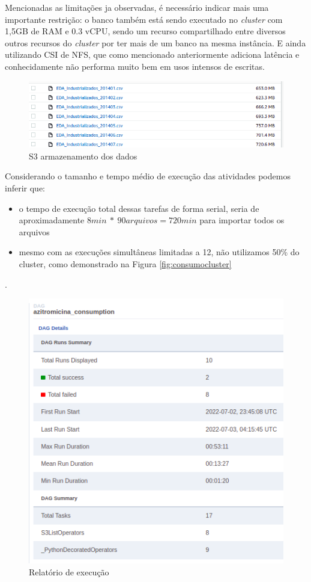Mencionadas as limitações ja observadas, é necessário indicar mais uma importante restrição: o banco também está sendo executado no \emph{cluster} com 1,5GB de RAM e 0.3 vCPU, sendo um recurso compartilhado entre diversos outros recursos do \emph{cluster} por ter mais de um banco na mesma instância. E ainda utilizando CSI de NFS, que como mencionado anteriormente adiciona latência e conhecidamente não performa muito bem em usos intensos de escritas.

\begin{figure}[!ht]
    \centering
    \includegraphics[width=0.8\linewidth]{04-figuras/s3_size.png}
    \caption{S3 armazenamento dos dados}
    \label{fig:s3_storage}
\end{figure}


Considerando o tamanho e tempo médio de execução das atividades podemos inferir que:
\begin{itemize}
    \item o tempo de execução total dessas tarefas de forma serial, seria de aproximadamente $8 min\ *\ 90 arquivos = 720min$ para importar todos os arquivos
    \item mesmo com as execuções simultâneas limitadas a 12, não utilizamos 50\% do cluster, como demonstrado na Figura \ref{fig:consumocluster}
\end{itemize} . 


\begin{figure}[!ht]
    \centering
    \includegraphics[width=0.5\linewidth]{04-figuras/report_execution_summary1.png}
    \caption{Relatório de execução}
    \label{fig:report}
\end{figure}

